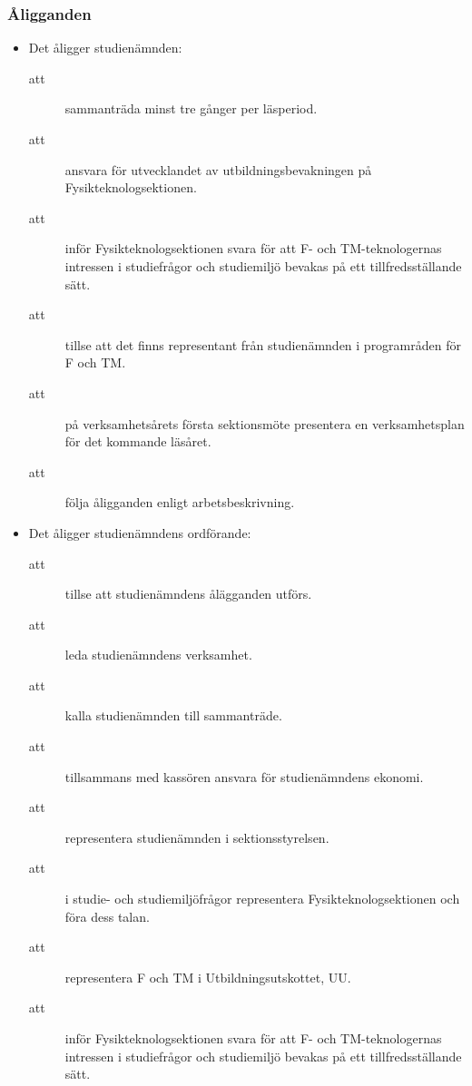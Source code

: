 \documentclass[11pt,a4paper]{article}
\begin{document}
\subsubsection{Åligganden}

\begin{itemize}%

  \item Det åligger studienämnden:
    \begin{description}
     
      \item[att]  sammanträda minst tre gånger per läsperiod.
    
      \item[att] ansvara för utvecklandet av utbildningsbevakningen på
				Fysiktekno\-log\-sektionen.
      \item[att] inför Fysikteknologsektionen svara för att F- och TM-teknologernas
      intressen i studie\-frågor och studiemiljö bevakas på ett
      tillfredsställande sätt.
      \item[att] tillse att det finns representant från studienämnden i programråden för F och TM.
      \item[att] på verksamhetsårets första sektionsmöte presentera en verksamhetsplan för det kommande läsåret.   
      \item[att] följa åligganden enligt arbetsbeskrivning.
    \end{description}

	\vspace{5mm}

  \item Det åligger studienämndens ordförande:
    \begin{description}
      \item[att] tillse att studienämndens ålägganden utförs.
      \item[att] leda studienämndens verksamhet.
      \item[att] kalla studienämnden till sammanträde.
      \item[att] tillsammans med kassören ansvara för studienämndens ekonomi.
      \item[att] representera studienämnden i sektionsstyrelsen.
      \item[att] i studie- och studiemiljöfrågor representera Fysikteknologsektionen och föra dess talan.
      \item[att] representera F och TM i Utbildningsutskottet, UU.
      \item[att] inför Fysikteknologsektionen svara för att F- och TM-teknologernas
      intressen i studie\-frågor och studiemiljö bevakas på ett
      tillfredsställande sätt.
    \end{description}


\end{itemize}
\end{document}
